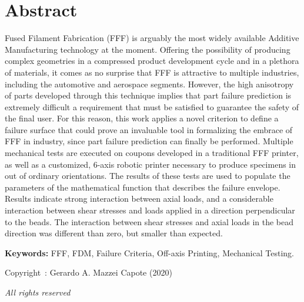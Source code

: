 \documentclass[main.tex]{subfiles}
\begin{document}
\setcounter{page}{1}
\chapter*{Abstract}
Fused Filament Fabrication (FFF) is arguably the most widely available Additive Manufacturing technology at the moment. Offering the possibility of producing complex geometries in a compressed product development cycle and in a plethora of materials, it comes as no surprise that FFF is attractive to multiple industries, including the automotive and aerospace segments. However, the high anisotropy of parts developed through this technique implies that part failure prediction is extremely difficult \textemdash a requirement that must be satisfied to guarantee the safety of the final user. For this reason, this work applies a novel criterion to define a failure surface that could prove an invaluable tool in formalizing the embrace of FFF in industry, since part failure prediction can finally be performed. Multiple mechanical tests are executed on coupons developed in a traditional FFF printer, as well as a customized, 6-axis robotic printer necessary to produce specimens in out of ordinary orientations. The results of these tests are used to populate the parameters of the mathematical function that describes the failure envelope. Results indicate strong interaction between axial loads, and a considerable interaction between shear stresses and loads applied in a direction perpendicular to the beads. The interaction between shear stresses and axial loads in the bead direction was different than zero, but smaller than expected.
 
\vspace{10mm} %
\textbf{Keywords:} FFF, FDM, Failure Criteria, Off-axis Printing, Mechanical Testing.

\vfill %
\begin{center}
Copyright~\textcopyright: Gerardo A. Mazzei Capote (2020)

\emph{All rights reserved}	
\end{center}
\end{document}
